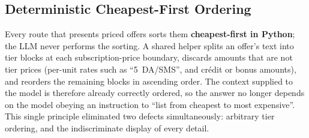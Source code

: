 \documentclass[12pt, a4paper]{report}
\newcommand{\humantext}[1]{#1}      %
\begin{document}
\subsection{Deterministic Cheapest-First Ordering}
\humantext{Every route that presents priced offers sorts them \textbf{cheapest-first in Python}; the LLM never performs the sorting. A shared helper splits an offer's text into tier blocks at each subscription-price boundary, discards amounts that are not tier prices (per-unit rates such as ``5~DA/SMS'', and crédit or bonus amounts), and reorders the remaining blocks in ascending order. The context supplied to the model is therefore already correctly ordered, so the answer no longer depends on the model obeying an instruction to ``list from cheapest to most expensive''. This single principle eliminated two defects simultaneously: arbitrary tier ordering, and the indiscriminate display of every detail.}
\end{document}
